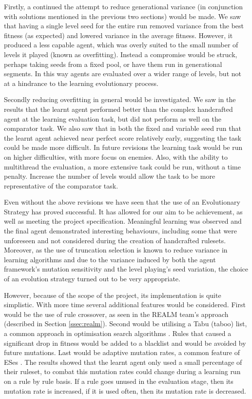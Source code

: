Firstly, a continued the attempt to reduce generational variance (in conjunction with solutions mentioned in the previous two sections) would be made. We saw that having a single level seed for the entire run removed variance from the best fitness (as expected) and lowered variance in the average fitness. However, it produced a less capable agent, which was overly suited to the small number of levels it played (known as overfitting). Instead a compromise would be struck, perhaps taking seeds from a fixed pool, or have them run in generational segments. In this way agents are evaluated over a wider range of levels, but not at a hindrance to the learning evolutionary process.

Secondly reducing overfitting in general would be investigated. We saw in the results that the learnt agent performed better than the complex handcrafted agent at the learning evaluation task, but did not perform as well on the comparator task. We also saw that in both the fixed and variable seed run that the learnt agent achieved near perfect score relatively early, suggesting the task could be made more difficult. In future revisions the learning task would be run on higher difficulties, with more focus on enemies. Also, with the ability to multithread the evaluation, a more extensive task could be run, without a time penalty. Increase the number of levels would allow the task to be more representative of the comparator task.

\vspace{\baselineskip}

Even without the above revisions we have seen that the use of an Evolutionary Strategy has proved successful. It has allowed for our aim to be achievement, as well as meeting the project specification. Meaningful learning was observed and the final agent demonstrated interesting behaviours, including some that were unforeseen and not considered during the creation of handcrafted rulesets. Moreover, as the use of truncation selection is known to reduce variance in learning algorithms \cite[s.~3.8.3]{geatbx} and due to the variance induced by both the agent framework's mutation sensitivity and the level playing's seed variation, the choice of an evolution strategy turned out to be very appropriate.

However, because of the scope of the project, its implementation is quite simplistic. With more time several additional features would be considered. First would be the use of rule crossover, as seen in the REALM team's approach (described in Section \ref{ssec:realm}). Second would be utilising a Tabu (taboo) list, a common approach in optimisation search algorithms \cite{tabu}. Rules that caused a significant drop in fitness would be added to a blacklist and would be avoided by future mutations. Last would be adaptive mutation rates, a common feature of ESes \cite[s.~4]{es-book}. The results showed that the learnt agent only used a small percentage of their ruleset, to combat this mutation rates could change during a learning run on a rule by rule basis. If a rule goes unused in the evaluation stage, then its mutation rate is increased, if it is used often, then its mutation rate is decreased.

